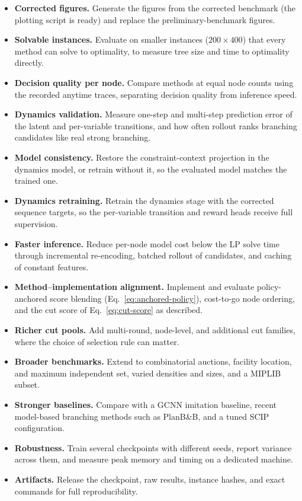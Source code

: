 \documentclass[11pt,a4paper]{article}
\begin{document}
\begin{itemize}
  \item \textbf{Corrected figures.} Generate the figures from the corrected benchmark (the plotting script is ready) and replace the preliminary-benchmark figures.
  \item \textbf{Solvable instances.} Evaluate on smaller instances ($200\times400$) that every method can solve to optimality, to measure tree size and time to optimality directly.
  \item \textbf{Decision quality per node.} Compare methods at equal node counts using the recorded anytime traces, separating decision quality from inference speed.
  \item \textbf{Dynamics validation.} Measure one-step and multi-step prediction error of the latent and per-variable transitions, and how often rollout ranks branching candidates like real strong branching.
  \item \textbf{Model consistency.} Restore the constraint-context projection in the dynamics model, or retrain without it, so the evaluated model matches the trained one.
  \item \textbf{Dynamics retraining.} Retrain the dynamics stage with the corrected sequence targets, so the per-variable transition and reward heads receive full supervision.
  \item \textbf{Faster inference.} Reduce per-node model cost below the LP solve time through incremental re-encoding, batched rollout of candidates, and caching of constant features.
  \item \textbf{Method--implementation alignment.} Implement and evaluate policy-anchored score blending (Eq.~\eqref{eq:anchored-policy}), cost-to-go node ordering, and the cut score of Eq.~\eqref{eq:cut-score} as described.
  \item \textbf{Richer cut pools.} Add multi-round, node-level, and additional cut families, where the choice of selection rule can matter.
  \item \textbf{Broader benchmarks.} Extend to combinatorial auctions, facility location, and maximum independent set, varied densities and sizes, and a MIPLIB subset.
  \item \textbf{Stronger baselines.} Compare with a GCNN imitation baseline, recent model-based branching methods such as PlanB\&B, and a tuned SCIP configuration.
  \item \textbf{Robustness.} Train several checkpoints with different seeds, report variance across them, and measure peak memory and timing on a dedicated machine.
  \item \textbf{Artifacts.} Release the checkpoint, raw results, instance hashes, and exact commands for full reproducibility.
\end{itemize}






\end{document}
